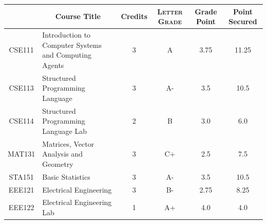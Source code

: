 \documentclass[11pt]{article}
\newcommand*{\numtwo}[1]{\pgfmathprintnumber[
                    fixed, precision=2, fixed zerofill=true]{#1}}
\begin{document}
                \begin{center}
                    \renewcommand{\arraystretch}{1.08}
                    
                \begin{tabular}{|c|l|c|>{\scshape}c|c|c|}
                \hline  \rule[-1ex]{0pt}{3.5ex} {\centering{\bf Course Code}} &  \multicolumn{1}{c|}{\textbf{Course Title}}  & {\bf Credits} & {\bf Letter Grade} & {\bf Grade Point} & {\bf Point Secured}  \\ 
                \hline   CSE111 &  Introduction to Computer Systems and Computing Agents		 & 3 & A & 3.75 & 11.25 \\ %
                \hline   CSE113 &  Structured Programming Language		 & 3 & A- & 3.5 & 10.5 \\ %
                \hline   CSE114 &  Structured Programming Language Lab		 & 2 & B & 3.0 & 6.0 \\ %
                \hline   MAT131 &  Matrices, Vector Analysis and Geometry		 & 3 & C+ & 2.5 & 7.5 \\ %
                \hline   STA151 &  Basic Statistics		 & 3 & A- & 3.5 & 10.5 \\ %
                \hline   EEE121 &  Electrical Engineering		 & 3 & B- & 2.75 & 8.25 \\ %
                \hline   EEE122 &  Electrical Engineering Lab		 & 1 & A+ & 4.0 & 4.0 \\ %

\hline                %
                \end{tabular}
                \end{center}
                \renewcommand{\arraystretch}{1.03}
\end{document}
